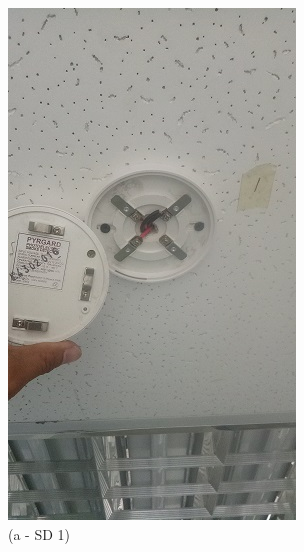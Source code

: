 \begin{figure}
	\begin{minipage}[b]{0.2\linewidth}
		\centering
				\includegraphics[width=\textwidth]{figures/R1P_fdas/SD1.jpg}
		\caption*{(a - SD 1)}
	\end{minipage}
	\hspace{0.05cm}
	\begin{minipage}[b]{0.2\linewidth}
		\centering

\end{minipage}
\end{figure}
